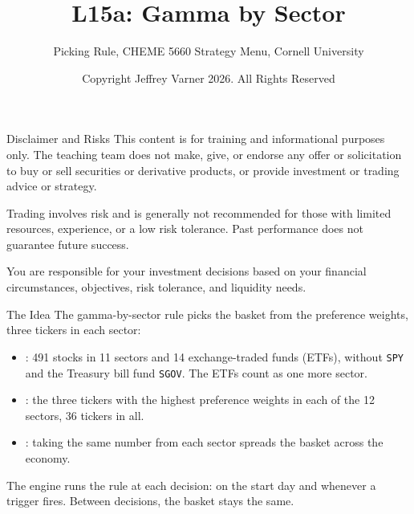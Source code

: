 \documentclass[aspectratio=169,11pt]{beamer}
\title{\texorpdfstring{{\vnheavy L15a}}{L15a}: Gamma by Sector}
\subtitle{Picking Rule, CHEME 5660 Strategy Menu, Cornell University}
\author{Copyright Jeffrey Varner 2026. All Rights Reserved}
\begin{document}
\vntitlepage

\begin{frame}{Disclaimer and Risks}
  \vspace{0.6em}
  \textbf{} This content is for training and informational
  purposes only. The teaching team does not make, give, or endorse any offer or
  solicitation to buy or sell securities or derivative products, or provide
  investment or trading advice or strategy.

  \vspace{1.1em}
  \textbf{} Trading involves risk and is generally not recommended for
  those with limited resources, experience, or a low risk tolerance. Past
  performance does not guarantee future success.

  \vspace{1.1em}
  \textbf{} You are responsible for your investment decisions
  based on your financial circumstances, objectives, risk tolerance, and
  liquidity needs.
\end{frame}

\begin{frame}{The Idea}
  \vspace{0.3em}
  The gamma-by-sector rule picks the basket from the preference weights, three tickers in each sector:
  \begin{itemize}\setlength{\itemsep}{0.5em}
    \item {}: 491 stocks in 11 sectors and 14 exchange-traded funds (ETFs), without \texttt{SPY} and the Treasury bill fund \texttt{SGOV}. The ETFs count as one more sector.
    \item {}: the three tickers with the highest preference weights in each of the 12 sectors, 36 tickers in all.
    \item {}: taking the same number from each sector spreads the basket across the economy.
  \end{itemize}

  \vspace{0.5em}
  The engine runs the rule at each decision: on the start day and whenever a trigger fires. Between decisions, the basket stays the same.
\end{frame}
\end{document}
